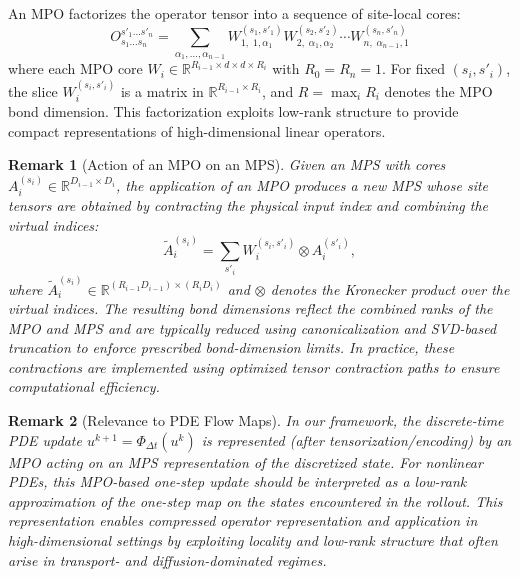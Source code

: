 \documentclass[letterpaper, 10 pt, conference]{ieeeconf}  %
\newtheorem{remark}{Remark}
\begin{document}
An MPO factorizes the operator tensor into a sequence of site-local cores:
\begin{equation}
O^{s'_1 \dots s'_n}_{s_1 \dots s_n}
=
\sum_{\alpha_1,\dots,\alpha_{n-1}}
W^{(s_1,s'_1)}_{1,\; 1,\alpha_1}
W^{(s_2,s'_2)}_{2,\; \alpha_1,\alpha_2}
\cdots
W^{(s_n,s'_n)}_{n,\; \alpha_{n-1},1}
\end{equation}
where each MPO core
$W_i \in \mathbb{R}^{R_{i-1} \times d \times d \times R_i}$ with
$R_0 = R_n = 1$. For fixed $(s_i,s'_i)$, the slice
$W_i^{(s_i,s'_i)}$ is a matrix in $\mathbb{R}^{R_{i-1}\times R_i}$, and
$R = \max_i R_i$ denotes the MPO bond dimension. This factorization exploits
low-rank structure to provide compact representations of high-dimensional
linear operators.

\begin{remark}[Action of an MPO on an MPS]
Given an MPS with cores $A_i^{(s_i)} \in \mathbb{R}^{D_{i-1} \times D_i}$, the
application of an MPO produces a new MPS whose site tensors are obtained by
contracting the physical input index and combining the virtual indices:
\begin{equation}
\widetilde{A}_i^{(s_i)}
=
\sum_{s'_i}
W_i^{(s_i,s'_i)} \otimes A_i^{(s'_i)},
\end{equation}
where $\widetilde{A}_i^{(s_i)} \in
\mathbb{R}^{(R_{i-1} D_{i-1}) \times (R_i D_i)}$ and $\otimes$ denotes the Kronecker product over the virtual indices. The resulting bond dimensions
reflect the combined ranks of the MPO and MPS and are typically reduced using
canonicalization and SVD-based truncation to enforce prescribed bond-dimension
limits. In practice, these contractions are implemented using optimized tensor
contraction paths to ensure computational efficiency.
\end{remark}

\begin{remark}[Relevance to PDE Flow Maps]
In our framework, the discrete-time PDE update
$u^{k+1} = \Phi_{\Delta t}(u^k)$ is represented (after tensorization/encoding)
by an MPO acting on an MPS representation of the discretized state. For
nonlinear PDEs, this MPO-based one-step update should be interpreted as a
low-rank approximation of the one-step map on the states encountered in
the rollout. This representation enables compressed operator representation and
application in high-dimensional settings by exploiting locality and low-rank
structure that often arise in transport- and diffusion-dominated regimes.
\end{remark}
\end{document}
